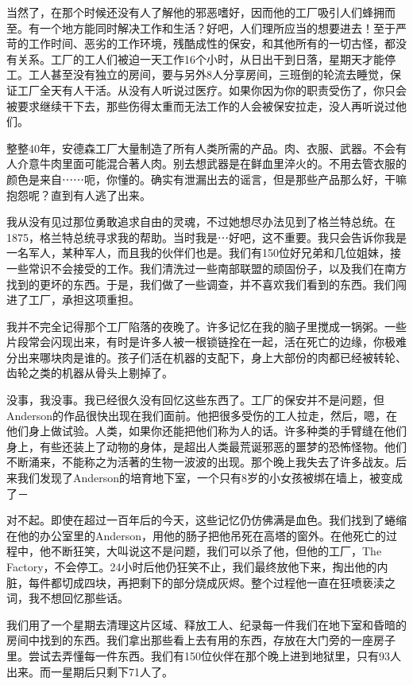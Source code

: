 当然了，在那个时候还没有人了解他的邪恶嗜好，因而他的工厂吸引人们蜂拥而至。有一个地方能同时解决工作和生活？好吧，人们理所应当的想要进去！至于严苛的工作时间、恶劣的工作环境，残酷成性的保安，和其他所有的一切古怪，都没有关系。工厂的工人们被迫一天工作16个小时，从日出干到日落，星期天才能停工。工人甚至没有独立的房间，要与另外8人分享房间，三班倒的轮流去睡觉，保证工厂全天有人干活。从没有人听说过医疗。如果你因为你的职责受伤了，你只会被要求继续干下去，那些伤得太重而无法工作的人会被保安拉走，没人再听说过他们。

整整40年，安德森工厂大量制造了所有人类所需的产品。肉、衣服、武器。不会有人介意牛肉里面可能混合著人肉。别去想武器是在鲜血里淬火的。不用去管衣服的颜色是来自⋯⋯呃，你懂的。确实有泄漏出去的谣言，但是那些产品那么好，干嘛抱怨呢？直到有人逃了出来。

我从没有见过那位勇敢追求自由的灵魂，不过她想尽办法见到了格兰特总统。在1875，格兰特总统寻求我的帮助。当时我是⋯好吧，这不重要。我只会告诉你我是一名军人，某种军人，而且我的伙伴们也是。我们有150位好兄弟和几位姐妹，接一些常识不会接受的工作。我们清洗过一些南部联盟的顽固份子，以及我们在南方找到的更坏的东西。于是，我们做了一些调查，并不喜欢我们看到的东西。我们闯进了工厂，承担这项重担。

我并不完全记得那个工厂陷落的夜晚了。许多记忆在我的脑子里搅成一锅粥。一些片段常会闪现出来，有时是许多人被一根锁链拴在一起，活在死亡的边缘，你极难分出来哪块肉是谁的。孩子们活在机器的支配下，身上大部份的肉都已经被转轮、齿轮之类的机器从骨头上剔掉了。

没事，我没事。我已经很久没有回忆这些东西了。工厂的保安并不是问题，但Anderson的作品很快出现在我们面前。他把很多受伤的工人拉走，然后，嗯，在他们身上做试验。人类，如果你还能把他们称为人的话。许多种类的手臂缝在他们身上，有些还装上了动物的身体，是超出人类最荒诞邪恶的噩梦的恐怖怪物。他们不断涌来，不能称之为活著的生物一波波的出现。那个晚上我失去了许多战友。后来我们发现了Anderson的培育地下室，一个只有8岁的小女孩被绑在墙上，被变成了－

对不起。即使在超过一百年后的今天，这些记忆仍仿佛满是血色。我们找到了蜷缩在他的办公室里的Anderson，用他的肠子把他吊死在高塔的窗外。在他死亡的过程中，他不断狂笑，大叫说这不是问题，我们可以杀了他，但他的工厂，The Factory，不会停工。24小时后他仍狂笑不止，我们最终放他下来，掏出他的内脏，每件都切成四块，再把剩下的部分烧成灰烬。整个过程他一直在狂喷亵渎之词，我不想回忆那些话。

我们用了一个星期去清理这片区域、释放工人、纪录每一件我们在地下室和昏暗的房间中找到的东西。我们拿出那些看上去有用的东西，存放在大门旁的一座房子里。尝试去弄懂每一件东西。我们有150位伙伴在那个晚上进到地狱里，只有93人出来。而一星期后只剩下71人了。

